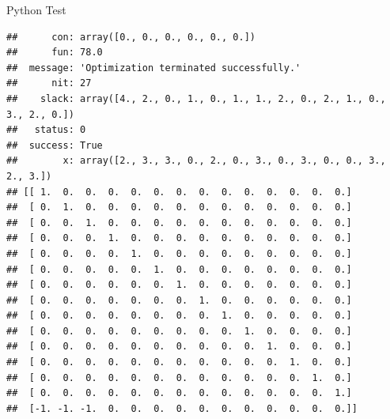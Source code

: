 \documentclass[
  ignorenonframetext,
]{beamer}
\begin{document}
\begin{frame}[fragile]{Python Test}
\begin{verbatim}
##      con: array([0., 0., 0., 0., 0., 0.])
##      fun: 78.0
##  message: 'Optimization terminated successfully.'
##      nit: 27
##    slack: array([4., 2., 0., 1., 0., 1., 1., 2., 0., 2., 1., 0., 3., 2., 0.])
##   status: 0
##  success: True
##        x: array([2., 3., 3., 0., 2., 0., 3., 0., 3., 0., 0., 3., 2., 3.])
## [[ 1.  0.  0.  0.  0.  0.  0.  0.  0.  0.  0.  0.  0.  0.]
##  [ 0.  1.  0.  0.  0.  0.  0.  0.  0.  0.  0.  0.  0.  0.]
##  [ 0.  0.  1.  0.  0.  0.  0.  0.  0.  0.  0.  0.  0.  0.]
##  [ 0.  0.  0.  1.  0.  0.  0.  0.  0.  0.  0.  0.  0.  0.]
##  [ 0.  0.  0.  0.  1.  0.  0.  0.  0.  0.  0.  0.  0.  0.]
##  [ 0.  0.  0.  0.  0.  1.  0.  0.  0.  0.  0.  0.  0.  0.]
##  [ 0.  0.  0.  0.  0.  0.  1.  0.  0.  0.  0.  0.  0.  0.]
##  [ 0.  0.  0.  0.  0.  0.  0.  1.  0.  0.  0.  0.  0.  0.]
##  [ 0.  0.  0.  0.  0.  0.  0.  0.  1.  0.  0.  0.  0.  0.]
##  [ 0.  0.  0.  0.  0.  0.  0.  0.  0.  1.  0.  0.  0.  0.]
##  [ 0.  0.  0.  0.  0.  0.  0.  0.  0.  0.  1.  0.  0.  0.]
##  [ 0.  0.  0.  0.  0.  0.  0.  0.  0.  0.  0.  1.  0.  0.]
##  [ 0.  0.  0.  0.  0.  0.  0.  0.  0.  0.  0.  0.  1.  0.]
##  [ 0.  0.  0.  0.  0.  0.  0.  0.  0.  0.  0.  0.  0.  1.]
##  [-1. -1. -1.  0.  0.  0.  0.  0.  0.  0.  0.  0.  0.  0.]]
\end{verbatim}

\end{frame}
\end{document}
